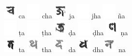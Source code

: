 \documentclass[a4paper,12pt]{article}
\begin{document}
{\includegraphics[height=8.0mm]{ca.jpg} ca \includegraphics[height=8.0mm]{white.jpg} cha \includegraphics[height=8.0mm]{ja.jpg} ja \includegraphics[height=8.0mm]{white.jpg} jha \includegraphics[height=8.0mm]{white.jpg} ña\\
\includegraphics[height=8.0mm]{white.jpg} ṭa \includegraphics[height=8.0mm]{white.jpg} ṭha \includegraphics[height=8.0mm]{rda.jpg} ḍa  \includegraphics[height=8.0mm]{white.jpg} ḍha \includegraphics[height=8.0mm]{rna.jpg} ṇa\\
\includegraphics[height=8.0mm]{ta.jpg} ta \includegraphics[height=8.0mm]{tha.jpg} tha \includegraphics[height=8.0mm]{da.jpg} da \includegraphics[height=8.0mm]{dha.jpg} dha\includegraphics[height=8.0mm]{na.jpg} na \\
}
\end{document}
